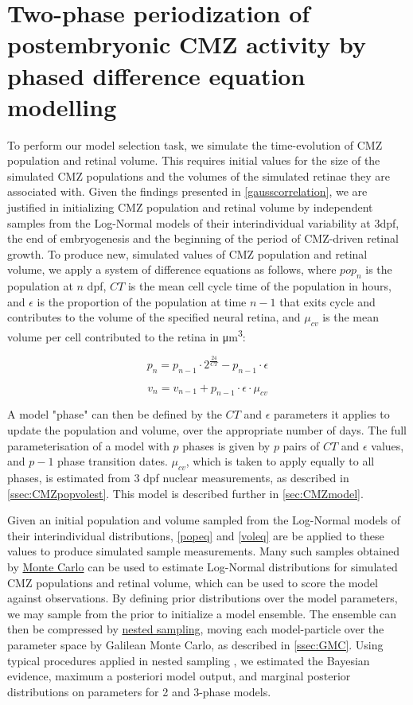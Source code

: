 \section{Two-phase periodization of postembryonic CMZ activity by phased difference equation modelling}
\label{sec:phaseGMC}
To perform our model selection task, we simulate the time-evolution of CMZ population and retinal volume. This requires initial values for the size of the simulated CMZ populations and the volumes of the simulated retinae they are associated with. Given the findings presented in \autoref{gausscorrelation}, we are justified in initializing CMZ population and retinal volume by independent samples from the Log-Normal models of their interindividual variability at 3dpf, the end of embryogenesis and the beginning of the period of CMZ-driven retinal growth. To produce new, simulated values of CMZ population and retinal volume, we apply a system of difference equations as follows, where $pop_n$ is the population at $n$ dpf, $CT$ is the mean cell cycle time of the population in hours, and $\epsilon$ is the proportion of the population at time $n-1$ that exits cycle and contributes to the volume of the specified neural retina, and $\mu_{cv}$ is the mean volume per cell contributed to the retina in \si{\cubic\micro\metre}:

\begin{equation}
    p_n=p_{n-1} \cdot 2^{\frac{24}{CT}} - p_{n-1} \cdot \epsilon
    \label{popeq}
\end{equation}

\begin{equation}
    v_n=v_{n-1} + p_{n-1} \cdot \epsilon \cdot \mu_{cv}
    \label{voleq}
\end{equation}

A model "phase" can then be defined by the $CT$ and $\epsilon$ parameters it applies to update the population and volume, over the appropriate number of days. The full parameterisation of a model with $p$ phases is given by $p$ pairs of $CT$ and $\epsilon$ values, and $p-1$ phase transition dates. $\mu_{cv}$, which is taken to apply equally to all phases, is estimated from 3 dpf nuclear measurements, as described in \autoref{ssec:CMZpopvolest}. This model is described further in \autoref{sec:CMZmodel}.

Given an initial population and volume sampled from the Log-Normal models of their interindividual distributions, \autoref{popeq} and \autoref{voleq} are be applied to these values to produce simulated sample measurements. Many such samples obtained by \hyperref[ssec:MonteCarlo]{Monte Carlo} can be used to estimate Log-Normal distributions for simulated CMZ populations and retinal volume, which can be used to score the model against observations. By defining prior distributions over the model parameters, we may sample from the prior to initialize a model ensemble. The ensemble can then be compressed by \hyperref[ssec:nested]{nested sampling}, moving each model-particle over the parameter space by Galilean Monte Carlo, as described in \autoref{ssec:GMC}. Using typical procedures applied in nested sampling \cite{Skilling2006}, we estimated the Bayesian evidence, maximum a posteriori model output, and marginal posterior distributions on parameters for 2 and 3-phase models.

